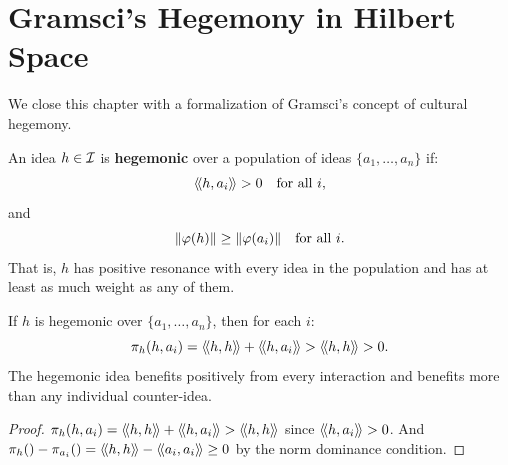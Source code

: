 \section{Gramsci's Hegemony in Hilbert Space}

We close this chapter with a formalization of Gramsci's concept of cultural
hegemony.

\begin{definition}
\label{def:hegemony}
An idea $h \in \mathcal{I}$ is \textbf{hegemonic} over a population of ideas
$\{a_1, \ldots, a_n\}$ if:
\[
  \langle\!\langle h, a_i \rangle\!\rangle > 0 \quad \text{for all } i,
\]
and
\[
  \lVert \varphi(h) \rVert \geq \lVert \varphi(a_i) \rVert \quad \text{for all } i.
\]
That is, $h$ has positive resonance with every idea in the population and has
at least as much weight as any of them.
\end{definition}

\begin{theorem}
\label{thm:hegemonic-stability}
If $h$ is hegemonic over $\{a_1, \ldots, a_n\}$, then for each $i$:
\[
  \pi_{h}(h, a_i) = \langle\!\langle h, h \rangle\!\rangle + \langle\!\langle h, a_i \rangle\!\rangle > \langle\!\langle h, h \rangle\!\rangle > 0.
\]
The hegemonic idea benefits positively from every interaction and benefits more
than any individual counter-idea.
\end{theorem}

\begin{proof}
$\pi_{h}(h, a_i) = \langle\!\langle h, h \rangle\!\rangle + \langle\!\langle h, a_i \rangle\!\rangle > \langle\!\langle h, h \rangle\!\rangle$ since
$\langle\!\langle h, a_i \rangle\!\rangle > 0$. And $\pi_{h}() - \pi_{a_i}() = \langle\!\langle h, h \rangle\!\rangle -
\langle\!\langle a_i, a_i \rangle\!\rangle \geq 0$ by the norm dominance condition.
\end{proof}

